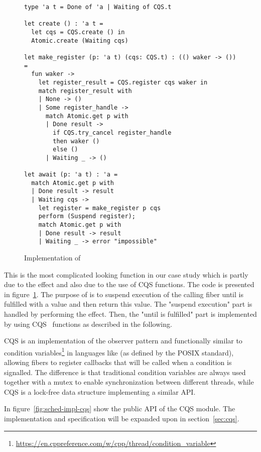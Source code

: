 \begin{figure}[ht]
  \begin{verbatim}
type 'a t = Done of 'a | Waiting of CQS.t

let create () : 'a t = 
  let cqs = CQS.create () in
  Atomic.create (Waiting cqs)

let make_register (p: 'a t) (cqs: CQS.t) : (() waker -> ()) = 
  fun waker ->
    let register_result = CQS.register cqs waker in
    match register_result with
    | None -> ()
    | Some register_handle ->
      match Atomic.get p with
      | Done result ->  
        if CQS.try_cancel register_handle
        then waker ()
        else ()
      | Waiting _ -> ()

let await (p: 'a t) : 'a = 
  match Atomic.get p with
  | Done result -> result
  | Waiting cqs ->
    let register = make_register p cqs
    perform (Suspend register);
    match Atomic.get p with
    | Done result -> result 
    | Waiting _ -> error "impossible"
  \end{verbatim}
  \caption{Implementation of }
  \label{fig:sched-impl-await}
\end{figure}

This is the most complicated looking function in our case study which is partly due to the \esuspend{} effect and also due to the use of CQS functions.
The code is presented in figure~\ref{fig:sched-impl-await}.
The purpose of  is to suspend execution of the calling fiber until  is fulfilled with a value and then return this value.
The "suspend execution" part is handled by performing the \esuspend{} effect.
Then, the "until  is fulfilled" part is implemented by using CQS~\cite{koval2023cqs} functions as described in the following.

CQS is an implementation of the observer pattern and functionally similar to condition variables\footnote{\url{https://en.cppreference.com/w/cpp/thread/condition_variable}} in languages like \CC{} (as defined by the POSIX standard), allowing fibers to register callbacks that will be called when a condition is signalled.
The difference is that traditional condition variables are always used together with a mutex to enable synchronization between different threads, while CQS is a lock-free data structure implementing a similar API.

In figure~\ref{fig:sched-impl-cqs} show the public API of the CQS module. The implementation and specification will be expanded upon in section~\ref{sec:cqs}.

